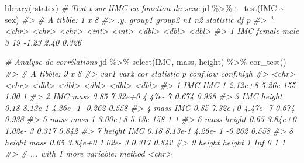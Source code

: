 \documentclass[
]{book}
\newenvironment{Shaded}{}{}
\newcommand{\CommentTok}[1]{\textit{#1}}
\newcommand{\FunctionTok}[1]{#1}
\newcommand{\NormalTok}[1]{#1}
\newcommand{\SpecialCharTok}[1]{#1}
\begin{document}
\begin{Shaded}
\begin{Highlighting}[]
\FunctionTok{library}\NormalTok{(rstatix)}
\CommentTok{\# Test{-}t sur l\textquotesingle{}IMC en fonction du sexe}
\NormalTok{jd }\SpecialCharTok{\%\textgreater{}\%} 
  \FunctionTok{t\_test}\NormalTok{(IMC }\SpecialCharTok{\textasciitilde{}}\NormalTok{ sex)}
\CommentTok{\#\textgreater{} \# A tibble: 1 x 8}
\CommentTok{\#\textgreater{}   .y.   group1 group2    n1    n2 statistic    df     p}
\CommentTok{\#\textgreater{} * \textless{}chr\textgreater{} \textless{}chr\textgreater{}  \textless{}chr\textgreater{}  \textless{}int\textgreater{} \textless{}int\textgreater{}     \textless{}dbl\textgreater{} \textless{}dbl\textgreater{} \textless{}dbl\textgreater{}}
\CommentTok{\#\textgreater{} 1 IMC   female male       3    19     {-}1.23  2.40 0.326}

\CommentTok{\# Analyse de corrélations}
\NormalTok{jd }\SpecialCharTok{\%\textgreater{}\%} 
  \FunctionTok{select}\NormalTok{(IMC, mass, height) }\SpecialCharTok{\%\textgreater{}\%} 
  \FunctionTok{cor\_test}\NormalTok{() }
\CommentTok{\#\textgreater{} \# A tibble: 9 x 8}
\CommentTok{\#\textgreater{}   var1   var2     cor statistic         p conf.low conf.high}
\CommentTok{\#\textgreater{}   \textless{}chr\textgreater{}  \textless{}chr\textgreater{}  \textless{}dbl\textgreater{}     \textless{}dbl\textgreater{}     \textless{}dbl\textgreater{}    \textless{}dbl\textgreater{}     \textless{}dbl\textgreater{}}
\CommentTok{\#\textgreater{} 1 IMC    IMC     1      2.12e+8 5.26e{-}155    1.00      1    }
\CommentTok{\#\textgreater{} 2 IMC    mass    0.85   7.32e+0 4.47e{-}  7    0.674     0.938}
\CommentTok{\#\textgreater{} 3 IMC    height  0.18   8.13e{-}1 4.26e{-}  1   {-}0.262     0.558}
\CommentTok{\#\textgreater{} 4 mass   IMC     0.85   7.32e+0 4.47e{-}  7    0.674     0.938}
\CommentTok{\#\textgreater{} 5 mass   mass    1      3.00e+8 5.13e{-}158    1         1    }
\CommentTok{\#\textgreater{} 6 mass   height  0.65   3.84e+0 1.02e{-}  3    0.317     0.842}
\CommentTok{\#\textgreater{} 7 height IMC     0.18   8.13e{-}1 4.26e{-}  1   {-}0.262     0.558}
\CommentTok{\#\textgreater{} 8 height mass    0.65   3.84e+0 1.02e{-}  3    0.317     0.842}
\CommentTok{\#\textgreater{} 9 height height  1    Inf       0            1         1    }
\CommentTok{\#\textgreater{} \# ... with 1 more variable: method \textless{}chr\textgreater{}}
\end{Highlighting}
\end{Shaded}
\end{document}
